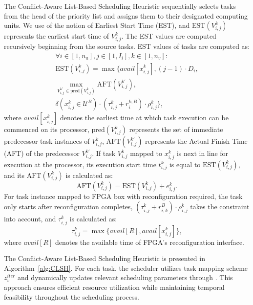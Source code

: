 \documentclass{IEEEtaes}
\begin{document}
The Conflict-Aware List-Based Scheduling Heuristic sequentially selects tasks from the head of the priority list and assigns them to their designated computing units. We use of the notion of Earliest Start Time (EST), and $\text{EST}(V_{i,j}^{k})$ represents the earliest  start time of $V_{i,j}^{k}$. The EST values are computed recursively beginning from the source tasks. EST values of tasks are computed as:
\begin{multline}
    \forall i\in[1,n_a],j\in[1,I_i],k\in [1,n_v]:
    \\ \text{EST}(V_{i,j}^{k})=\max\bigg\{avail[x_{i,j}^{k}],(j-1)\cdot D_i,\\
    \max\limits_{V_{i,j}^{k'}\in \text{pred}(V_{i,j}^{k})}\text{AFT}(V_{i,j}^{k'}),\\
    \delta(x_{i,j}^{k}\in \mathcal{U}^B)\cdot(\tau_{i,j}^k+r_{i}^{k,B})\cdot \rho_{i,j}^k\bigg\},
\label{equ:EST1}
\end{multline}
where $avail[x_{i,j}^{k}]$ denotes the earliest time at which task execution can be commenced on its processor, $\text{pred}(V_{i,j}^{k})$ represents the set of immediate predecessor task instances of $V_{i,j}^{k}$, $\text{AFT}(V_{i,j}^{k'})$ represents the Actual Finish Time (AFT) of the predecessor $V_{i,j}^{k'}$. If task $V_{i,j}^{k}$ mapped to $x_{i,j}^{k}$ is next in line for execution at the processor, its execution start time $t_{i,j}^k$ is equal to $\text{EST}(V_{i,j}^{k})$, and its $\text{AFT}(V_{i,j}^{k})$ is calculated as:
\begin{equation}
    \text{AFT}(V_{i,j}^{k})=
    \text{EST}(V_{i,j}^{k})+e_{i,j}^k.
\label{equ:AFT}
\end{equation}
For task instance mapped to FPGA box with reconfiguration required, the task only starts after reconfiguration completes, $(\tau_{i,j}^k+r_{i,k}^B)\cdot \rho_{i,j}^k$ takes the constraint into account, and $\tau_{i,j}^k$ is calculated as:
\begin{equation}
    \tau_{i,j}^k=\max\{avail[R],avail[x_{i,j}^{k}]\},
\label{equ:tr}
\end{equation}
where $avail[R]$ denotes the available time of FPGA's reconfiguration interface.

The Conflict-Aware List-Based Scheduling Heuristic is presented in Algorithm~\ref{alg:CLSH}. For each task, the scheduler utilizes task mapping scheme $z_v^{iter}$ and dynamically updates relevant scheduling parameters through . This approach ensures efficient resource utilization while maintaining temporal feasibility throughout the scheduling process.
\end{document}
